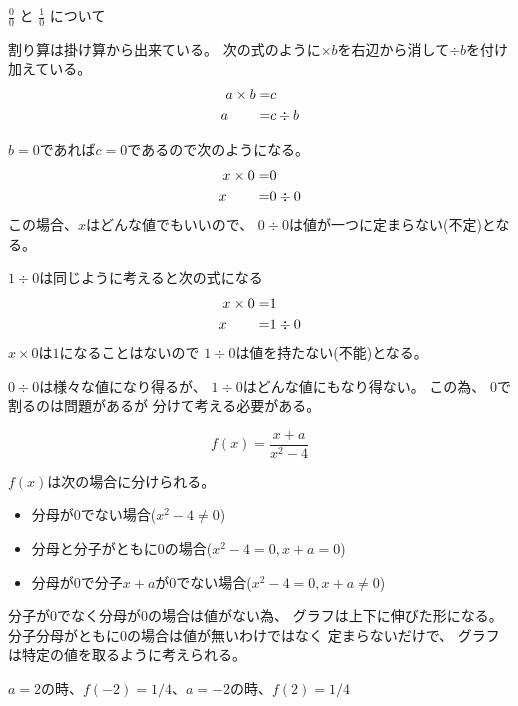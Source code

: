 \documentclass[12pt,b5paper]{ltjsarticle}
\begin{document}
$\displaystyle \frac{0}{0}$
と
$\displaystyle \frac{1}{0}$
について

\quad

割り算は掛け算から出来ている。
次の式のように$\times b$を右辺から消して$\div b$を付け加えている。
\begin{align}
 a \times b = & c \phantom{\div b}\\
 a \hspace*{20pt} = & c \div b
\end{align}

$b=0$であれば$c=0$であるので次のようになる。
\begin{align}
 x \times 0 = & 0 \phantom{\div b}\\
 x \hspace*{20pt} = & 0 \div 0
\end{align}
この場合、$x$はどんな値でもいいので、
$0\div0$は値が一つに定まらない(不定)となる。

$1\div0$は同じように考えると次の式になる
\begin{align}
 x \times 0 = & 1 \phantom{\div b}\\
 x \hspace*{20pt} = & 1 \div 0
\end{align}
$x\times0$は$1$になることはないので
$1\div0$は値を持たない(不能)となる。

$0\div0$は様々な値になり得るが、
$1\div0$はどんな値にもなり得ない。
この為、
$0$で割るのは問題があるが
分けて考える必要がある。



\hrulefill

\begin{equation}
 f(x)=\frac{x+a}{x^2-4}
\end{equation}

$f(x)$は次の場合に分けられる。
\begin{itemize}
 \item 分母が$0$でない場合($x^2-4\ne0$)
 \item 分母と分子がともに$0$の場合($x^2-4=0, x+a=0$)
 \item 分母が$0$で分子$x+a$が$0$でない場合($x^2-4=0, x+a\ne0$)
\end{itemize}

分子が$0$でなく分母が$0$の場合は値がない為、
グラフは上下に伸びた形になる。
分子分母がともに$0$の場合は値が無いわけではなく
定まらないだけで、
グラフは特定の値を取るように考えられる。

$a=2$の時、$f(-2)=1/4$、$a=-2$の時、$f(2)=1/4$
\end{document}
